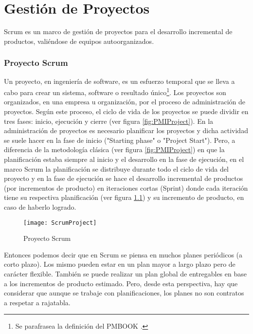 \chapter{Gestión de Proyectos}

Scrum es un marco de gestión de proyectos para el desarrollo incremental de productos, valiéndose de equipos autoorganizados. 



\subsection{Proyecto Scrum}

Un proyecto, en ingeniería de software, es un esfuerzo temporal que se lleva a cabo para crear un sistema, software o resultado único\footnote{Se parafrasea la definición del PMBOOK \cite{PMBOK-2004}.}. Los proyectos son organizados, en una empresa u organización, por el proceso de administración de proyectos. Según este proceso, el ciclo de vida de los proyectos se puede dividir en tres fases: inicio, ejecución y cierre (ver figura \ref{fig:PMIProject}). En la administración de proyectos es necesario planificar los proyectos y dicha actividad se suele hacer en la fase de inicio ("Starting phase" o "Project Start"). Pero, a diferencia de la metodología clásica (ver figura \ref{fig:PMIProject}) en que la planificación estaba siempre al inicio y el desarrollo en la fase de ejecución, en el marco Scrum la planificación se distribuye durante todo el ciclo de vida del proyecto y en la fase de ejecución se hace el desarrollo incremental de productos (por incrementos de producto) en iteraciones cortas (Sprint) donde cada iteración tiene su respectiva planificación (ver figura \ref{fig:ScrumProject}) y su incremento de producto, en caso de haberlo logrado.

\begin{figure}[h]
  \centering
  \texttt{[image: ScrumProject]}
  \caption{Proyecto Scrum}
  \centering
  \label{fig:ScrumProject} %
\end{figure}

Entonces podemos decir que en Scrum se piensa en muchos planes periódicos (a corto plazo). Los mismo pueden estar en un plan mayor a largo plazo pero de carácter flexible. También se puede realizar un plan global de entregables en base a los incrementos de producto estimado. Pero, desde esta perspectiva, hay que considerar que aunque se trabaje con planificaciones, los planes no son contratos a respetar a rajatabla.

